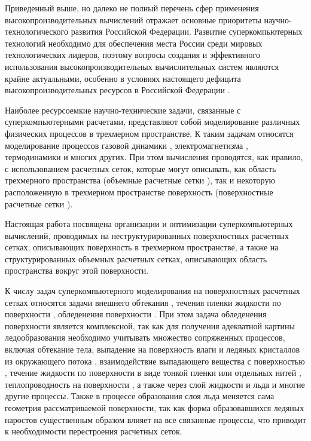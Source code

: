 \documentclass[a4paper,14pt]{extarticle}                     %
\numberwithin{equation}{section}                             %
\numberwithin{figure}{section}                               %
\numberwithin{table}{section}                                %
\theoremstyle{plain}                                         %
\numberwithin{theorem}{section}                              %
\numberwithin{lemma}{section}                                %
\numberwithin{definition}{section}                           %
\begin{document}
Приведенный выше, но далеко не полный перечень сфер применения высокопроизводительных вычислений отражает основные приоритеты научно-технологического развития Российской Федерации.
Развитие суперкомпьютерных технологий необходимо для обеспечения места России среди мировых технологических лидеров, поэтому вопросы создания и эффективного использования высокопроизводительных вычислительных систем являются крайне актуальными, особенно в условиях настоящего дефицита высокопроизводительных ресурсов в Российской Федерации \cite{Voevodin2021SuperRussia}.

Наиболее ресурсоемкие научно-технические задачи, связанные с суперкомпьютерными расчетами, представляют собой моделирование различных физических процессов в трехмерном пространстве.
К таким задачам относятся моделирование процессов газовой динамики \cite{Lobanova2023GeneralGas}, электромагнетизма \cite{Taboada2013GeneralElectro}, термодинамики \cite{Liu2020GeneralThermo} и многих других.
При этом вычисления проводятся, как правило, с использованием расчетных сеток, которые могут описывать, как область трехмерного пространства (объемные расчетные сетки \cite{Kudryavzeva2014GeneralVolumeMesh}), так и некоторую расположенную в трехмерном пространстве поверхность (поверхностные расчетные сетки \cite{Zheleznyakova2016GeneralSurfMesh}).

Настоящая работа посвящена организации и оптимизации суперкомпьютерных вычислений, проводимых на неструктурированных поверхностных расчетных сетках, описывающих поверхность в трехмерном пространстве, а также на структурированных объемных расчетных сетках, описывающих область пространства вокруг этой поверхности.

К числу задач суперкомпьютерного моделирования на поверхностных расчетных сетках относятся задачи внешнего обтекания \cite{Mitin2020Flow}, течения пленки жидкости по поверхности \cite{Li2014Film}, обледенения поверхности \cite{Koshelev2020Ice,Sorokin2020Ice}.
При этом задача обледенения поверхности является комплексной, так как для получения адекватной картины ледообразования необходимо учитывать множество сопряженных процессов, включая обтекание тела, выпадение на поверхность влаги и ледяных кристаллов из окружающего потока \cite{Cui2023Impingement}, взаимодействие выпадающего вещества с поверхностью \cite{Cui2021Impingement}, течение жидкости по поверхности в виде тонкой пленки или отдельных нитей \cite{Alexeenko2013Ice}, теплопроводность на поверхности \cite{Domingos2015IceHeat}, а также через слой жидкости и льда \cite{Xin2013Ice} и многие другие процессы.
Также в процессе образования слоя льда меняется сама геометрия рассматриваемой поверхности, так как форма образовавшихся ледяных наростов существенным образом влияет на все связанные процессы, что приводит к необходимости перестроения расчетных сеток.
\end{document}
